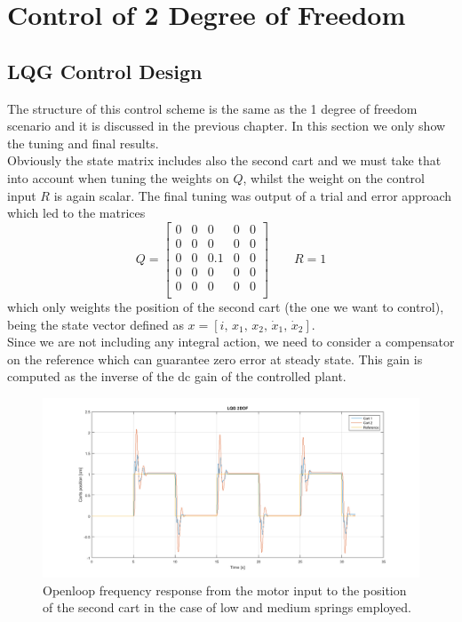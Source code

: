 {\let\clearpage\relax \chapter{Control of 2 Degree of Freedom}}
\section{LQG Control Design}

The structure of this control scheme is the same as the 1 degree of freedom scenario and it is discussed in the previous chapter. In this section we only show the tuning and final results.\\

Obviously the state matrix includes also the second cart and we must take that into account when tuning the weights on $Q$, whilst the weight on the control input $R$ is again scalar. The final tuning was output of a trial and error approach which led to the matrices
\begin{equation}
\renewcommand{\arraystretch}{1}
	Q = 
	\begin{bmatrix}
		0 & 0 & 0 & 0 & 0 \\
		0 & 0 & 0 & 0 & 0 \\
		0 & 0 & 0.1 & 0 & 0 \\
		0 & 0 & 0 & 0 & 0 \\
		0 & 0 & 0 & 0 & 0 \\
	\end{bmatrix}
	\qquad
	R=1
\end{equation}
which only weights the position of the second cart (the one we want to control), being the state vector defined as $x = \left[ i,\, x_1,\, x_2,\, \dot{x}_1,\, \dot{x}_2 \right] $.\\

Since we are not including any integral action, we need to consider a compensator on the reference which can guarantee zero error at steady state. This gain is computed as the inverse of the dc gain of the controlled plant.

\begin{figure}[h]
\centering
\includegraphics[width=0.5\linewidth]{img/lqg_2dof.png}
\caption{Openloop frequency response from the motor input to the position of the second cart in the case of low and medium springs employed.}
\label{fig:lqg2dof}
\end{figure}








